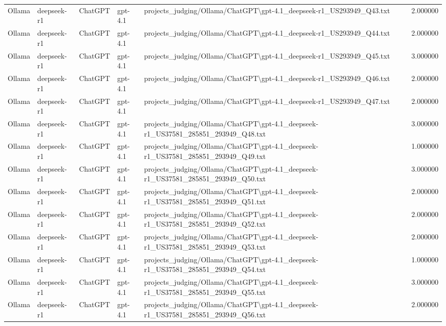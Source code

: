 \begin{table}[H]
\begin{tabular}{lllllr}
Ollama & deepseek-r1 & ChatGPT & gpt-4.1 & projects\_judging/Ollama/ChatGPT\textbackslash gpt-4.1\_deepseek-r1\_US293949\_Q43.txt & 2.000000 \\
Ollama & deepseek-r1 & ChatGPT & gpt-4.1 & projects\_judging/Ollama/ChatGPT\textbackslash gpt-4.1\_deepseek-r1\_US293949\_Q44.txt & 2.000000 \\
Ollama & deepseek-r1 & ChatGPT & gpt-4.1 & projects\_judging/Ollama/ChatGPT\textbackslash gpt-4.1\_deepseek-r1\_US293949\_Q45.txt & 3.000000 \\
Ollama & deepseek-r1 & ChatGPT & gpt-4.1 & projects\_judging/Ollama/ChatGPT\textbackslash gpt-4.1\_deepseek-r1\_US293949\_Q46.txt & 2.000000 \\
Ollama & deepseek-r1 & ChatGPT & gpt-4.1 & projects\_judging/Ollama/ChatGPT\textbackslash gpt-4.1\_deepseek-r1\_US293949\_Q47.txt & 2.000000 \\
Ollama & deepseek-r1 & ChatGPT & gpt-4.1 & projects\_judging/Ollama/ChatGPT\textbackslash gpt-4.1\_deepseek-r1\_US37581\_285851\_293949\_Q48.txt & 3.000000 \\
Ollama & deepseek-r1 & ChatGPT & gpt-4.1 & projects\_judging/Ollama/ChatGPT\textbackslash gpt-4.1\_deepseek-r1\_US37581\_285851\_293949\_Q49.txt & 1.000000 \\
Ollama & deepseek-r1 & ChatGPT & gpt-4.1 & projects\_judging/Ollama/ChatGPT\textbackslash gpt-4.1\_deepseek-r1\_US37581\_285851\_293949\_Q50.txt & 3.000000 \\
Ollama & deepseek-r1 & ChatGPT & gpt-4.1 & projects\_judging/Ollama/ChatGPT\textbackslash gpt-4.1\_deepseek-r1\_US37581\_285851\_293949\_Q51.txt & 2.000000 \\
Ollama & deepseek-r1 & ChatGPT & gpt-4.1 & projects\_judging/Ollama/ChatGPT\textbackslash gpt-4.1\_deepseek-r1\_US37581\_285851\_293949\_Q52.txt & 2.000000 \\
Ollama & deepseek-r1 & ChatGPT & gpt-4.1 & projects\_judging/Ollama/ChatGPT\textbackslash gpt-4.1\_deepseek-r1\_US37581\_285851\_293949\_Q53.txt & 2.000000 \\
Ollama & deepseek-r1 & ChatGPT & gpt-4.1 & projects\_judging/Ollama/ChatGPT\textbackslash gpt-4.1\_deepseek-r1\_US37581\_285851\_293949\_Q54.txt & 1.000000 \\
Ollama & deepseek-r1 & ChatGPT & gpt-4.1 & projects\_judging/Ollama/ChatGPT\textbackslash gpt-4.1\_deepseek-r1\_US37581\_285851\_293949\_Q55.txt & 3.000000 \\
Ollama & deepseek-r1 & ChatGPT & gpt-4.1 & projects\_judging/Ollama/ChatGPT\textbackslash gpt-4.1\_deepseek-r1\_US37581\_285851\_293949\_Q56.txt & 2.000000 \\

\end{tabular}
\end{table}
